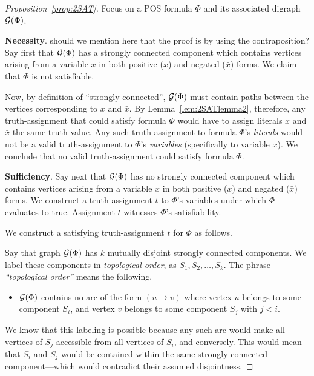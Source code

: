 \begin{proof}[Proposition~\ref{prop:2SAT}]
Focus on a POS formula $\Phi$ and its associated digraph $\mbox{$\cal G$}(\Phi)$.

{\bf Necessity}.
{\Denis should we mention here that the proof is by using the contraposition?}
Say first that $\mbox{$\cal G$}(\Phi)$ has a strongly connected component which
contains vertices arising from a variable $x$ in both positive ($x$)
and negated ($\bar{x}$) forms.  We claim that $\Phi$ is not
satisfiable.

Now, by definition of ``strongly connected'', $\mbox{$\cal G$}(\Phi)$ must contain
paths between the vertices corresponding to $x$ and $\bar{x}$.  By
Lemma~\ref{lem:2SATlemma2}, therefore, any truth-assignment that could
satisfy formula $\Phi$ would have to assign literals $x$ and $\bar{x}$
the same truth-value.  Any such truth-assignment to formula $\Phi$'s
{\em literals} would not be a valid truth-assignment to $\Phi$'s {\em
  variables} (specifically to variable $x$).  We conclude that no
valid truth-assignment could satisfy formula $\Phi$.

\medskip

{\bf Sufficiency}.
Say next that $\mbox{$\cal G$}(\Phi)$ has no strongly connected component which
contains vertices arising from a variable $x$ in both positive ($x$)
and negated ($\bar{x}$) forms.  We construct a truth-assignment $t$ to
$\Phi$'s variables under which $\Phi$ evaluates to {\sc true}.
Assignment $t$ witnesses $\Phi$'s satisfiability.

We construct a satisfying truth-assignment $t$ for $\Phi$ as follows.

Say that graph $\mbox{$\cal G$}(\Phi)$ has $k$ mutually disjoint strongly connected
components.  We label these components in {\it topological order},
 as $S_1, S_2, \ldots, S_k$.  The phrase
{\it ``topological order''} means the following.
\begin{itemize}
\item
$\mbox{$\cal G$}(\Phi)$ contains no arc of the form $(u \rightarrow v)$ where
  vertex $u$ belongs to some component $S_i$, and vertex $v$ belongs
  to some component $S_j$ with $j < i$.
\end{itemize}
We know that this labeling is possible because any such arc would make
all vertices of $S_j$ accessible from all vertices of $S_i$, and
conversely.  This would mean that $S_i$ and $S_j$ would be contained
within the same strongly connected component---which would contradict
their assumed disjointness.
\medskip


\end{proof}
